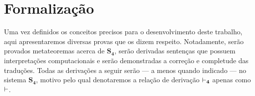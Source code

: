    \chapter{Formalização}
        Uma vez definidos os conceitos precisos para o desenvolvimento deste trabalho, aqui apresentaremos diversas provas que os dizem respeito. Notadamente, serão provados metateoremas acerca de $\mathbf{S_4}$, serão derivadas sentenças que possuem interpretações computacionais e serão demonstradas a correção e completude das traduções. Todas as derivações a seguir serão --- a menos quando indicado --- no sistema $\mathbf{S_4}$, motivo pelo qual denotaremos a relação de derivação $\mathrel{\vdash}_{\mathbf{4}}$ apenas como $\mathrel{\vdash}$.

        
        
        
        

    
    

